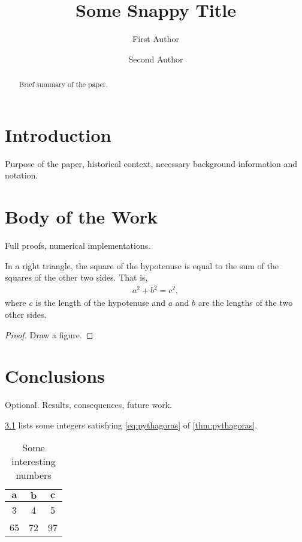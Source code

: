\documentclass[a4paper, article, oneside, UKenglish]{memoir}
\title{Some Snappy Title}
\author{First Author \and Second Author}
\newcommand{\0}{\mathbf{0}}
\newcommand{\1}{\mathbf{1}}
\begin{document}
\maketitle


\begin{abstract}
    \noindent
    Brief summary of the paper.
\end{abstract}


\chapter{Introduction}


Purpose of the paper, historical context, necessary background information and notation.


\chapter{Body of the Work}


Full proofs, numerical implementations.

\begin{theorem}[Pythagoras]
    \label{thm:pythagoras}
    In a right triangle, the square of the hypotenuse is equal to the sum of the squares of the other two sides. That is,
    \begin{align}
        \label{eq:pythagoras}
            a^2 + b^2 = c^2,
    \end{align}
    where \(c\) is the length of the hypotenuse and \(a\) and \(b\) are the lengths of the two other sides.
\end{theorem}

\begin{proof}
    Draw a figure.
\end{proof}


\chapter{Conclusions}


Optional. Results, consequences, future work.

\cref{tab:numbers} lists some integers satisfying \cref{eq:pythagoras} of \cref{thm:pythagoras}.

\begin{table}[htbp]
    \centering
    \begin{tabular}{ccc}
        \toprule
        \(\boldsymbol{a}\) & \(\boldsymbol{b}\) & \(\boldsymbol{c}\)
        \\
        \midrule
        3 & 4 & 5
        \\
        65 & 72 & 97
        \\
        \bottomrule
    \end{tabular}
    \caption{Some interesting numbers}
    \label{tab:numbers}
\end{table}


\printbibliography
\end{document}
